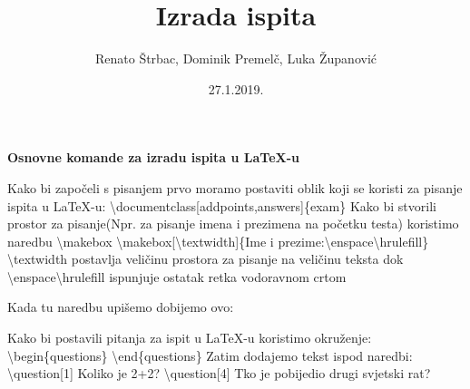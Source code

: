 \documentclass[addpoints,answers]{beamer}
\newcounter{points}
\begin{document}
	\title{Izrada ispita}
	\date{27.1.2019.}
	\author{Renato Štrbac, Dominik Premelč, Luka Županović}
	\maketitle
	\begin{frame}
	\begin{center}
		\textbf{Osnovne komande za izradu ispita u LaTeX-u}
	\end{center}
\end{frame}

\begin{frame}
Kako bi započeli s pisanjem prvo moramo postaviti oblik koji se koristi za pisanje ispita u LaTeX-u:
\newline
\newline
\color{blue}
\textbackslash{documentclass[addpoints,answers]\{exam\}}
\color{black}
\newline
\newline
Kako bi stvorili prostor za pisanje(Npr. za pisanje imena i prezimena na početku testa) koristimo naredbu \textbackslash{makebox}
\newline
\newline
\color{blue}
\textbackslash{makebox[\textbackslash{textwidth}]}\{Ime i prezime:\textbackslash{enspace\textbackslash{hrulefill}}\}
\color{black}
\newline
\newline
\textbackslash{textwidth} postavlja veličinu prostora za pisanje na veličinu teksta dok \textbackslash{enspace\textbackslash{hrulefill}} ispunjuje ostatak retka vodoravnom crtom
\end{frame}

\begin{frame}
Kada tu naredbu upišemo dobijemo ovo:
\newline
\newline
{}
\end{frame}

\begin{frame}
Kako bi postavili pitanja za ispit u LaTeX-u koristimo okruženje:
\newline
\newline
\color{blue}
\textbackslash{begin\{questions\}}
\color{black}
\color{blue}
\newline
\newline
\textbackslash{end\{questions\}}
\color{black}
\newline
\newline
Zatim dodajemo tekst ispod naredbi:
\newline
\newline
\color{blue}
\textbackslash{question[1]}
\color{black}
\newline
Koliko je 2+2?
\newline
\newline
\color{blue}
\textbackslash{question[4]}
\color{black}
\newline
Tko je pobijedio drugi svjetski rat?

\end{frame}
\end{document}
